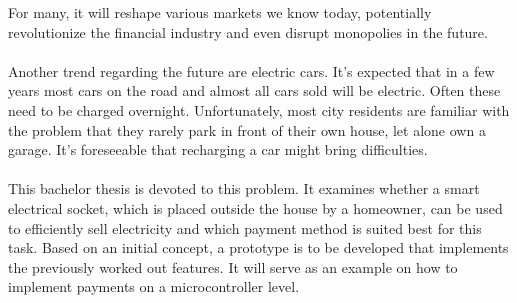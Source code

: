 For many, it will reshape various markets we know today, potentially revolutionize the financial industry and even disrupt monopolies in the future.
\\\\
Another trend regarding the future are electric cars.
It's expected that in a few years most cars on the road and almost all cars sold will be electric.
Often these need to be charged overnight.
Unfortunately, most city residents are familiar with the problem that they rarely park in front of their own house, let alone own a garage.
It's foreseeable that recharging a car might bring difficulties.
\\\\ 
This bachelor thesis is devoted to this problem.
It examines whether a smart electrical socket, which is placed outside the house by a homeowner, can be used to efficiently sell electricity and which payment method is suited best for this task.
Based on an initial concept, a prototype is to be developed that implements the previously worked out features.
It will serve as an example on how to implement  payments on a microcontroller level.